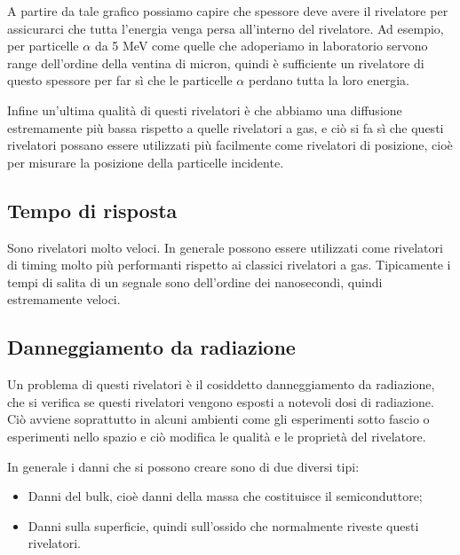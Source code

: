 \begin{esempio}
\begin{minipage}{0.63\textwidth}
      A partire da tale grafico possiamo capire che spessore deve avere il rivelatore per assicurarci che tutta l'energia venga persa all'interno del rivelatore. Ad esempio, per particelle $\alpha$ da 5 MeV come quelle che adoperiamo in laboratorio servono range dell'ordine della ventina di micron, quindi è sufficiente un rivelatore di questo spessore per far sì che le particelle $\alpha$ perdano tutta la loro energia.
   \end{minipage}
\end{esempio}

Infine un'ultima qualità di questi rivelatori è che abbiamo una diffusione estremamente più bassa rispetto a quelle rivelatori a gas, e ciò si fa sì che questi rivelatori possano essere utilizzati più facilmente come rivelatori di posizione, cioè per misurare la posizione della particelle incidente.

\subsection{Tempo di risposta}

Sono rivelatori molto veloci. In generale possono essere utilizzati come rivelatori di timing molto più performanti rispetto ai classici rivelatori a gas. Tipicamente i tempi di salita di un segnale sono dell'ordine dei nanosecondi, quindi estremamente veloci.

\subsection{Danneggiamento da radiazione}
Un problema di questi rivelatori è il cosiddetto danneggiamento da radiazione, che si verifica se questi rivelatori vengono esposti a notevoli dosi di radiazione. Ciò avviene soprattutto in alcuni ambienti come gli esperimenti sotto fascio o esperimenti nello spazio e ciò modifica le qualità e le proprietà del rivelatore.

In generale i danni che si possono creare sono di due diversi tipi:
\begin{itemize}
   \item Danni del bulk, cioè danni della massa che costituisce il semiconduttore;
   \item Danni sulla superficie, quindi sull'ossido che normalmente riveste questi rivelatori.
\end{itemize}

